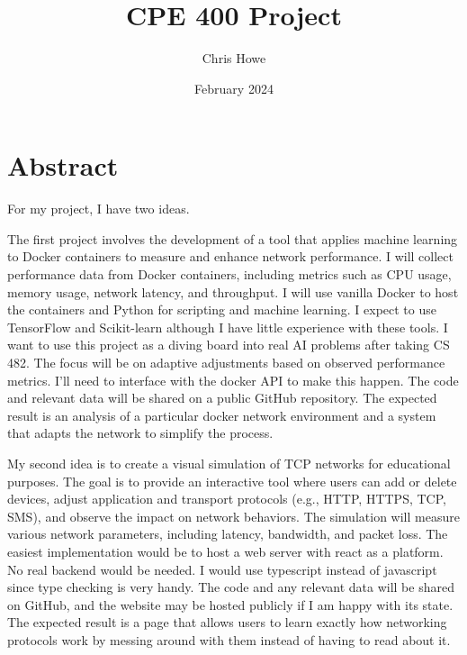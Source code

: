 \documentclass{article}
\title{CPE 400 Project}
\author{Chris Howe}
\date{February 2024}
\begin{document}
\maketitle

\section{Abstract}
For my project, I have two ideas.

The first project involves the development of a tool that applies machine learning to Docker containers to measure and enhance network performance. I will collect performance data from Docker containers, including metrics such as CPU usage, memory usage, network latency, and throughput. I will use vanilla Docker to host the containers and Python for scripting and machine learning. I expect to use TensorFlow and Scikit-learn although I have little experience with these tools. I want to use this project as a diving board into real AI problems after taking CS 482. The focus will be on adaptive adjustments based on observed performance metrics. I’ll need to interface with the docker API to make this happen. The code and relevant data will be shared on a public GitHub repository. The expected result is an analysis of a particular docker network environment and a system that adapts the network to simplify the process.

My second idea is to create a visual simulation of TCP networks for educational purposes. The goal is to provide an interactive tool where users can add or delete devices, adjust application and transport protocols (e.g., HTTP, HTTPS, TCP, SMS), and observe the impact on network behaviors. The simulation will measure various network parameters, including latency, bandwidth, and packet loss. The easiest implementation would be to host a web server with react as a platform. No real backend would be needed. I would use typescript instead of javascript since type checking is very handy. The code and any relevant data will be shared on GitHub, and the website may be hosted publicly if I am happy with its state. The expected result is a page that allows users to learn exactly how networking protocols work by messing around with them instead of having to read about it.
\end{document}
